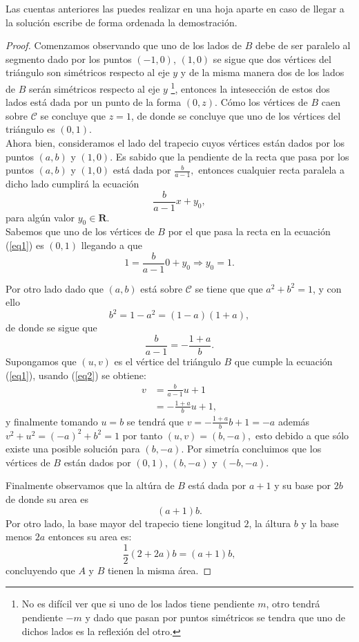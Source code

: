 \documentclass[a4paper,openright,10pt]{book}
\numberwithin{equation}{section}
\theoremstyle{definition}
\theoremstyle{definition}
\begin{document}
\begin{itemize}
\begin{enumerate}[a)]
Las cuentas anteriores las puedes realizar en una hoja aparte en caso de llegar a la solución escribe de forma ordenada la demostración.

\end{enumerate}

\begin{proof} Comenzamos observando que uno de los lados de $B$ debe de ser paralelo al segmento dado por los puntos $(-1,0)$, $(1,0)$ se sigue que dos vértices del triángulo son simétricos respecto al eje $y$ y de la misma manera dos de los lados de $B$ serán simétricos respecto al eje $y$ \footnote{No es difícil ver que si uno de los lados tiene pendiente $m$, otro tendrá pendiente $-m$ y dado que pasan por puntos simétricos se tendra que uno de dichos lados es la reflexión del otro.}, entonces la intesección de estos dos lados está dada por un punto de la forma $(0,z)$. Cómo los vértices de $B$ caen sobre $\mathcal{C}$ se concluye que $z=1$, de donde se concluye que uno de los vértices del triángulo es $(0,1).$\\

Ahora bien, consideramos el lado del trapecio cuyos vértices están dados por los puntos $(a,b)$ y $(1,0)$. Es sabido que la pendiente de la recta que pasa por los puntos $(a,b)$ y $(1,0)$ está dada por    $ \frac{b}{a-1}, $ 
entonces cualquier recta paralela a dicho lado cumplirá la ecuación 
\begin{equation}\label{eq1}
 \frac{b}{a-1}x+y_0,
\end{equation}
para algún valor $y_0 \in \mathbf{R}$. \\
Sabemos que uno de los vértices de $B$ por el que pasa la recta en la ecuación (\ref{eq1}) es $(0,1)$ llegando a que 
$$1=\frac{b}{a-1}0+y_0 \Rightarrow y_0=1.$$

Por otro lado dado que $(a,b)$ está sobre $\mathcal{C}$ se tiene que que $a^2+ b^2=1$, y con ello 
$$ b^2 = 1-a^2=(1-a)(1+a),$$ 
de donde se sigue que
\begin{equation}\label{eq2}
 \frac{b}{a-1}= -\frac{1+a}{b}.
\end{equation}
Supongamos que $(u,v)$ es el vértice del triángulo $B$ que cumple la ecuación (\ref{eq1}), usando (\ref{eq2}) se obtiene:
\begin{align*}
v&=  \frac{b}{a-1}u+1\\
&= -\frac{1+a}{b} u + 1,
\end{align*}
y finalmente tomando $u=b$ se tendrá que $v=-\frac{1+a}{b}b+1=-a$ además $v^2+u^2=(-a)^2+b^2=1$ por tanto $(u,v)=(b,-a),$ esto debido a que sólo existe una posible solución para $(b,-a).$ Por simetría concluimos que los vértices de $B$ están dados por $(0,1)$, $(b,-a)$ y $(-b,-a).$ 

Finalmente observamos que la altúra de $B$ está dada por $a+1$ y su base por $2b$ de donde su area es $$(a+1)b.$$
Por otro lado, la base mayor del trapecio tiene longitud $2$, la áltura $b$ y la base menos $2a$ entonces su area es:
$$\frac{1}{2}(2+2a)b=(a+1)b,$$
concluyendo que $A$ y $B$ tienen la misma área.
\end{proof} 

\end{itemize}
\end{document}
